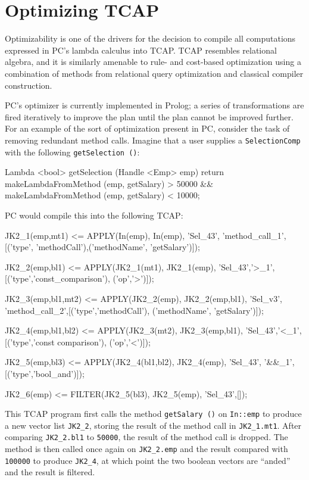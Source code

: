 
\section{Optimizing TCAP}
\label{sec:optimizer}

Optimizability is one of the drivers for
the decision to compile all computations expressed in PC's lambda calculus into TCAP.  
TCAP resembles relational algebra, and it is similarly amenable to rule- and cost-based optimization
using a combination of methods from relational query optimization and classical compiler construction.

PC's optimizer is currently implemented
in Prolog; a series of transformations are fired iteratively to improve the plan until the plan cannot be improved further.
For an example of the sort of optimization present in PC, consider the task of removing redundant method calls.  Imagine that a user
supplies a \texttt{SelectionComp} with the following \texttt{getSelection ()}:

\begin{codesmall} 
Lambda <bool> getSelection (Handle  <Emp> emp) {
   return makeLambdaFromMethod
      (emp, getSalary) > 50000 &&
      makeLambdaFromMethod (emp, getSalary) < 10000;
}	
\end{codesmall}

\noindent PC would compile this into the following TCAP:

\begin{codesmall}
JK2_1(emp,mt1) <= APPLY(In(emp), In(emp), 'Sel_43',
  'method_call_1',[('type', 'methodCall'),('methodName',
  'getSalary')]);

JK2_2(emp,bl1) <= APPLY(JK2_1(mt1), JK2_1(emp), 
  'Sel_43','>_1',[('type','const_comparison'),
   ('op','>')]);

JK2_3(emp,bl1,mt2) <= APPLY(JK2_2(emp), JK2_2(emp,bl1), 
  'Sel_v3', 'method_call_2',[('type','methodCall'), 
  ('methodName', 'getSalary')]);

JK2_4(emp,bl1,bl2) <= APPLY(JK2_3(mt2), JK2_3(emp,bl1), 
  'Sel_43','<_1',[('type','const comparison'),
  ('op','<')]);

JK2_5(emp,bl3) <= APPLY(JK2_4(bl1,bl2), JK2_4(emp), 
  'Sel_43', '&&_1',[('type','bool_and')]);

JK2_6(emp) <= FILTER(JK2_5(bl3), JK2_5(emp), 'Sel_43',[]);
\end{codesmall}

\noindent
This TCAP program first calls the method \texttt{getSalary ()} on \texttt{In::emp} to produce a new vector list \texttt{JK2\_2}, storing the result
of the method call in \texttt{JK2\_1.mt1}.  After comparing \texttt{JK2\_2.bl1} to \texttt{50000}, the result of the method call is dropped.
The method is then called once again on \texttt{JK2\_2.emp} and the result compared with \texttt{100000} to produce \texttt{JK2\_4}, at which 
point the two boolean vectors are ``anded'' and the result is filtered.

